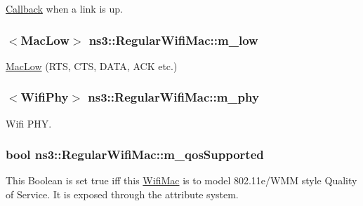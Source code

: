 \hyperlink{classns3_1_1Callback}{Callback} when a link is up. 

\subsubsection[{\texorpdfstring{m\+\_\+low}{m_low}}]{$<${\bf Mac\+Low}$>$ ns3\+::\+Regular\+Wifi\+Mac\+::m\+\_\+low\hspace{0.3cm}{\ttfamily [protected]}}\hypertarget{classns3_1_1RegularWifiMac_a726ce0ade9bb7e6b7d81cd397f32dbde}{}\label{classns3_1_1RegularWifiMac_a726ce0ade9bb7e6b7d81cd397f32dbde}


\hyperlink{classns3_1_1MacLow}{Mac\+Low} (R\+TS, C\+TS, D\+A\+TA, A\+CK etc.) 

\subsubsection[{\texorpdfstring{m\+\_\+phy}{m_phy}}]{$<${\bf Wifi\+Phy}$>$ ns3\+::\+Regular\+Wifi\+Mac\+::m\+\_\+phy\hspace{0.3cm}{\ttfamily [protected]}}\hypertarget{classns3_1_1RegularWifiMac_a1a6dad8eb0a057a4e1b459f518457a4c}{}\label{classns3_1_1RegularWifiMac_a1a6dad8eb0a057a4e1b459f518457a4c}


Wifi P\+HY. 

\subsubsection[{\texorpdfstring{m\+\_\+qos\+Supported}{m_qosSupported}}]{\setlength{\rightskip}{0pt plus 5cm}bool ns3\+::\+Regular\+Wifi\+Mac\+::m\+\_\+qos\+Supported\hspace{0.3cm}{\ttfamily [protected]}}\hypertarget{classns3_1_1RegularWifiMac_aeecdb918687493a8efdd70304bc0cee9}{}\label{classns3_1_1RegularWifiMac_aeecdb918687493a8efdd70304bc0cee9}
This Boolean is set {\ttfamily true} iff this \hyperlink{classns3_1_1WifiMac}{Wifi\+Mac} is to model 802.\+11e/\+W\+MM style Quality of Service. It is exposed through the attribute system.

